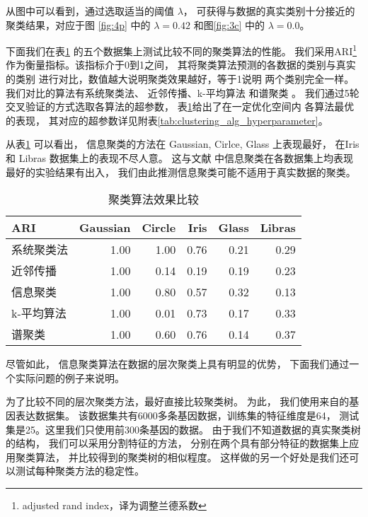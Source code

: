 从图中可以看到，通过选取适当的阈值 $\lambda$，
可获得与数据的真实类别十分接近的聚类结果，对应于图
\ref{fig:4p} 中的 $\lambda=0.42$
和图\ref{fig:3c} 中的 $\lambda=0.0$。

下面我们在表\ref{tab:clustering_dataset}
的五个数据集上测试比较不同的聚类算法的性能。
我们采用ARI\footnote{adjusted rand index，译为调整兰德系数}
作为衡量指标。该指标介于0到1之间，
其将聚类算法预测的各数据的类别与真实的类别
进行对比，数值越大说明聚类效果越好，等于1说明
两个类别完全一样。我们对比的算法有系统聚类法\cite{slink}、
近邻传播\cite{frey2007clustering}、k-平均算法
\cite{lloyd1982least}
和谱聚类 \cite{shi2000normalized}。
我们通过5轮交叉验证的方式选取各算法的超参数，
表\ref{tab:clustering_dataset}给出了在一定优化空间内
各算法最优的表现，
其对应的超参数详见附表\ref{tab:clustering_alg_hyperparameter}。

从表\ref{tab:clustering_dataset}
可以看出，
信息聚类的方法在 Gaussian, Cirlce, Glass 上表现最好，
在Iris 和 Libras 数据集上的表现不尽人意。
这与文献\citep{mac} 中信息聚类在各数据集上均表现最好的实验结果有出入，
我们由此推测信息聚类可能不适用于真实数据的聚类。

\begin{table}[!ht]
  \centering
\begin{tabular}{lrrrrr}
  \hline
   ARI  &   Gaussian &   Circle &   Iris &   Glass &   Libras \\
  \hline
   系统聚类法         &       1.00 &     1.00 &   0.76 &    0.21 &     0.29 \\
   近邻传播  &       1.00 &     0.14 &   0.19 &    0.19 &     0.23 \\
   信息聚类                  &       1.00 &     0.80 &   0.57 &    0.32 &     0.13 \\
   k-平均算法              &       1.00 &     0.01 &   0.73 &    0.17 &     0.33 \\
   谱聚类   &       1.00 &     0.60 &   0.76 &    0.14 &     0.37 \\
  \hline
\end{tabular}
\caption{聚类算法效果比较}\label{tab:clustering_dataset}
\end{table}

尽管如此， 信息聚类算法在数据的层次聚类上具有明显的优势，
下面我们通过一个实际问题的例子来说明。

为了比较不同的层次聚类方法，最好直接比较聚类树。
为此，
我们使用来自\citet{khan2001classification}的基因表达数据集。
该数据集共有6000多条基因数据，训练集的特征维度是64，
测试集是25。这里我们只使用前300条基因的数据。
由于我们不知道数据的真实聚类树的结构，
我们可以采用分割特征的方法，
分别在两个具有部分特征的数据集上应用聚类算法，
并比较得到的聚类树的相似程度。
这样做的另一个好处是我们还可以测试每种聚类方法的稳定性。

